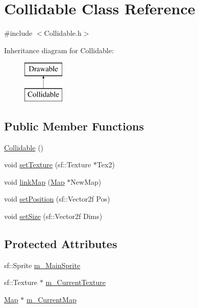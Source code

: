 \hypertarget{class_collidable}{}\section{Collidable Class Reference}
\label{class_collidable}


{\ttfamily \#include $<$Collidable.\+h$>$}

Inheritance diagram for Collidable\+:\begin{figure}[H]
\begin{center}
\leavevmode
\includegraphics[height=2.000000cm]{class_collidable}
\end{center}
\end{figure}
\subsection*{Public Member Functions}
\begin{DoxyCompactItemize}
\item 
\hyperlink{class_collidable_a92ce9e2b08086bb2f466168ffc69c9ed}{Collidable} ()
\item 
void \hyperlink{class_collidable_aa36d916f476104c226f726f68a78332c}{set\+Texture} (sf\+::\+Texture $\ast$Tex2)
\item 
void \hyperlink{class_collidable_ac62c1afe6fa4230c44d90cb3c1069d9c}{link\+Map} (\hyperlink{class_map}{Map} $\ast$New\+Map)
\item 
void \hyperlink{class_collidable_acbba316c96106bbe80e52b88719c8d88}{set\+Position} (sf\+::\+Vector2f Pos)
\item 
void \hyperlink{class_collidable_af2176b520091af90ed0d5b3a659d4239}{set\+Size} (sf\+::\+Vector2f Dims)
\end{DoxyCompactItemize}
\subsection*{Protected Attributes}
\begin{DoxyCompactItemize}
\item 
sf\+::\+Sprite \hyperlink{class_collidable_a97a8109150e5554b0be46626358e4f3e}{m\+\_\+\+Main\+Sprite}
\item 
sf\+::\+Texture $\ast$ \hyperlink{class_collidable_a1a7e160650b4938d439e7162930216b8}{m\+\_\+\+Current\+Texture}
\item 
\hyperlink{class_map}{Map} $\ast$ \hyperlink{class_collidable_a7110bdccba193a0120ae255ef553c087}{m\+\_\+\+Current\+Map}
\end{DoxyCompactItemize}


